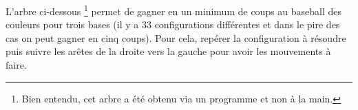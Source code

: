 L'arbre ci-dessous
\footnote{
    Bien entendu, cet arbre a été obtenu via un programme et non à la main.
}
permet de gagner en un minimum de coups au baseball des couleurs pour trois bases (il y a 33 configurations différentes et dans le pire des cas on peut gagner en cinq coups).
Pour cela, repérer la configuration à résoudre puis suivre les arêtes de la droite vers la gauche pour avoir les mouvements à faire.


